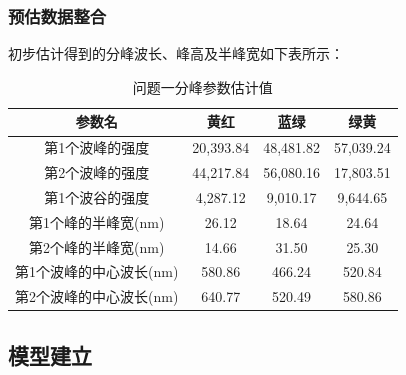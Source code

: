 \documentclass{article}
\numberwithin{equation}{subsection}
\begin{document}
\subsubsection{预估数据整合}
初步估计得到的分峰波长、峰高及半峰宽如下表所示：
\begin{table}[!htbp]
    \centering
    \begin{tabular}{|c|c|c|c|}\hline
        参数名 &黄红&蓝绿&绿黄\\\hline
        第1个波峰的强度&20,393.84
        &48,481.82
        &57,039.24
        \\
        第2个波峰的强度&44,217.84
        &56,080.16
        &17,803.51
        \\
        第1个波谷的强度&4,287.12
        &9,010.17
        &9,644.65
        \\
        第1个峰的半峰宽(nm)&26.12
        &18.64
        &24.64
        \\
        第2个峰的半峰宽(nm)&14.66
        &31.50
        &25.30
        \\第1个波峰的中心波长(nm)&580.86
        &466.24
        &520.84
        \\第2个波峰的中心波长(nm)&640.77
        &520.49
        &580.86
        \\
        \hline
    \end{tabular}
    \caption{问题一分峰参数估计值}
    \label{问题一预估数据}
\end{table}
    

\subsection{模型建立}
\end{document}
